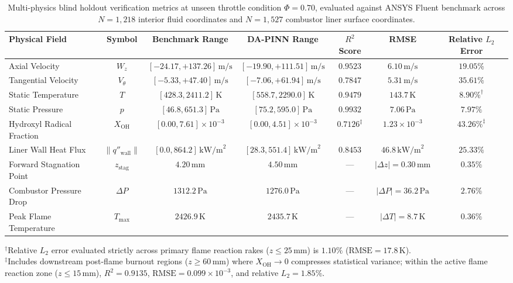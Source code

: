 \documentclass[reprint,aps,prfluids,superscriptaddress,twocolumn,floatfix]{revtex4-2}
\begin{document}
\begin{table}[t]
\centering
\caption{Multi-physics blind holdout verification metrics at unseen throttle condition $\Phi = 0.70$, evaluated against ANSYS Fluent benchmark across $N = 1,218$ interior fluid coordinates and $N = 1,527$ combustor liner surface coordinates.}
\label{tab:blind_holdout_metrics}
\small
\begin{tabular*}{\textwidth}{@{\extracolsep{\fill}}lcccccc}
\toprule
Physical Field & Symbol & Benchmark Range & DA-PINN Range & $R^2$ Score & RMSE & Relative $L_2$ Error \\
\midrule
Axial Velocity & $W_z$ & $[-24.17, +137.26]\,\text{m/s}$ & $[-19.90, +111.51]\,\text{m/s}$ & $0.9523$ & $6.10\,\text{m/s}$ & $19.05\%$ \\
Tangential Velocity & $V_\theta$ & $[-5.33, +47.40]\,\text{m/s}$ & $[-7.06, +61.94]\,\text{m/s}$ & $0.7847$ & $5.31\,\text{m/s}$ & $35.61\%$ \\
Static Temperature & $T$ & $[428.3, 2411.2]\,\text{K}$ & $[558.7, 2290.0]\,\text{K}$ & $0.9479$ & $143.7\,\text{K}$ & $8.90\%^\dagger$ \\
Static Pressure & $p$ & $[46.8, 651.3]\,\text{Pa}$ & $[75.2, 595.0]\,\text{Pa}$ & $0.9932$ & $7.06\,\text{Pa}$ & $7.97\%$ \\
Hydroxyl Radical Fraction & $X_{\text{OH}}$ & $[0.00, 7.61] \times 10^{-3}$ & $[0.00, 4.51] \times 10^{-3}$ & $0.7126^\ddagger$ & $1.23 \times 10^{-3}$ & $43.26\%^\ddagger$ \\
Liner Wall Heat Flux & $\|q''_{\text{wall}}\|$ & $[0.0, 864.2]\,\text{kW/m}^2$ & $[28.3, 551.4]\,\text{kW/m}^2$ & $0.8453$ & $46.8\,\text{kW/m}^2$ & $25.33\%$ \\
Forward Stagnation Point & $z_{\text{stag}}$ & $4.20\,\text{mm}$ & $4.50\,\text{mm}$ & --- & $|\Delta z| = 0.30\,\text{mm}$ & $0.35\%$ \\
Combustor Pressure Drop & $\Delta P$ & $1312.2\,\text{Pa}$ & $1276.0\,\text{Pa}$ & --- & $|\Delta P| = 36.2\,\text{Pa}$ & $2.76\%$ \\
Peak Flame Temperature & $T_{\text{max}}$ & $2426.9\,\text{K}$ & $2435.7\,\text{K}$ & --- & $|\Delta T| = 8.7\,\text{K}$ & $0.36\%$ \\
\bottomrule
\end{tabular*}
\begin{flushleft}
\footnotesize
$^\dagger$Relative $L_2$ error evaluated strictly across primary flame reaction rakes ($z \le 25\,\text{mm}$) is $1.10\%$ ($\text{RMSE} = 17.8\,\text{K}$). \\
$^\ddagger$Includes downstream post-flame burnout regions ($z \ge 60\,\text{mm}$) where $X_{\mathrm{OH}} \to 0$ compresses statistical variance; within the active flame reaction zone ($z \le 15\,\text{mm}$), $R^2 = 0.9135$, $\text{RMSE} = 0.099 \times 10^{-3}$, and relative $L_2 = 1.85\%$.
\end{flushleft}
\end{table}
\end{document}
